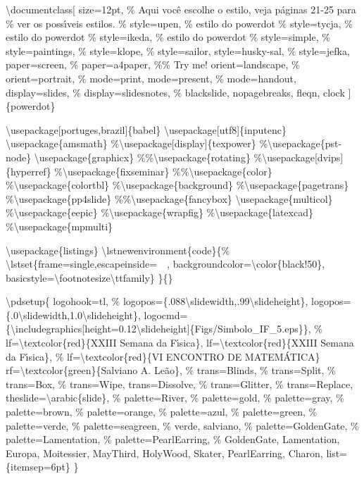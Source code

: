 \backslash{}documentclass[
  size=12pt,
\% Aqui voc\^e escolhe o estilo, veja p\'aginas 21-25 para
\% ver os poss\'{\i}veis estilos. 
\%  style=upen,     \% estilo do powerdot 
\%  style=tycja,   \% estilo do powerdot
\%  style=ikeda,   \% estilo do powerdot
\%  style=simple,
\%  style=paintings,
\%  style=klope,
\%  style=sailor,
  style=husky-sal,
\%  style=jefka,
  paper=screen,
\%  paper=a4paper,
\%\% Try me!
  orient=landscape,
\%  orient=portrait,
\%  mode=print,
  mode=present,
\%  mode=handout,
  display=slides,
\%  display=slidesnotes,
\%  blackslide,
  nopagebreaks,
  fleqn,
  clock
]\{powerdot\}

\backslash{}usepackage[portuges,brazil]\{babel\}
\backslash{}usepackage[utf8]\{inputenc\}
\backslash{}usepackage\{amsmath\}
\%\backslash{}usepackage[display]\{texpower\}
\%\backslash{}usepackage\{pst-node\}
\backslash{}usepackage\{graphicx\}
\%\%\backslash{}usepackage\{rotating\}
\%\backslash{}usepackage[dvips]\{hyperref\}
\%\backslash{}usepackage\{fixseminar\}
\%\%\backslash{}usepackage\{color\}
\%\backslash{}usepackage\{colortbl\}
\%\backslash{}usepackage\{background\}
\%\backslash{}usepackage\{pagetrans\}
\%\backslash{}usepackage\{pp4slide\}
\%\%\backslash{}usepackage\{fancybox\}
\backslash{}usepackage\{multicol\}
\%\backslash{}usepackage\{eepic\}
\%\backslash{}usepackage\{wrapfig\}
\%\backslash{}usepackage\{latexcad\}
\%\backslash{}usepackage\{mpmulti\}

\backslash{}usepackage\{listings\}
\backslash{}lstnewenvironment\{code\}\{\%
\backslash{}lstset\{frame=single,escapeinside=~~,
backgroundcolor=\backslash{}color\{black!50\},
basicstyle=\backslash{}footnotesize\backslash{}ttfamily\}
\}\{\}

\backslash{}pdsetup\{
  logohook=tl,
\%  logopos=\{.088\backslash{}slidewidth,.99\backslash{}slideheight\},
  logopos=\{.0\backslash{}slidewidth,1.0\backslash{}slideheight\},
  logocmd=\{\backslash{}includegraphics[height=0.12\backslash{}slideheight]\{Figs/Simbolo\_IF\_5.eps\}\},
\%  lf=\backslash{}textcolor\{red\}\{XXIII Semana da F\'{\i}sica\},
  lf=\backslash{}textcolor\{red\}\{XXIII Semana da F\'{\i}sica\},
\%  lf=\backslash{}textcolor\{red\}\{VI ENCONTRO DE MATEM\'ATICA\}
  rf=\backslash{}textcolor\{green\}\{Salviano A. Le\~ao\},
\%  trans=Blinds,
\%  trans=Split,
\%   trans=Box,
\%  trans=Wipe,
   trans=Dissolve,
\%  trans=Glitter,
\%  trans=Replace,
   theslide=\backslash{}arabic\{slide\},
\%   palette=River,
\%   palette=gold,
\%   palette=gray,
\%   palette=brown,
\%   palette=orange,
\%   palette=azul,
\%   palette=green,
\%   palette=verde,
\%   palette=seagreen,  \% verde, salviano,
\%   palette=GoldenGate,
\%   palette=Lamentation,
\%   palette=PearlEarring, \% GoldenGate, Lamentation, Europa, Moitessier, MayThird, HolyWood, Skater, PearlEarring, Charon,
list=\{itemsep=6pt\}
\}


